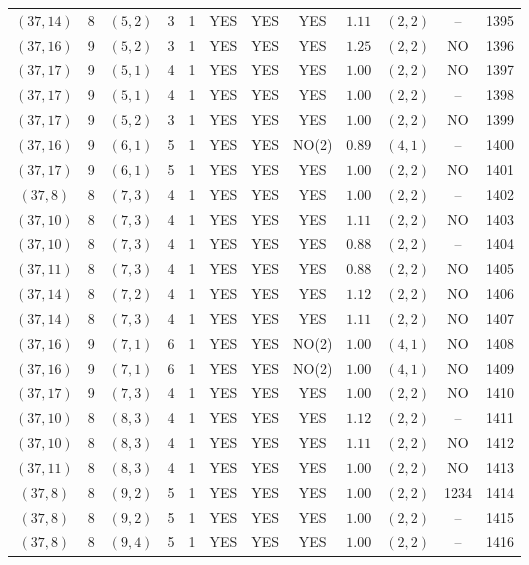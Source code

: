 \begin{longtable}{|c|c|c|c|c|c|c|c|c|c|c|c|}
$(37,14)$ & 8 & $(5,2)$ & 3 & 1 & YES & YES & YES & $1.11$ & $(2,2)$ & -- & 1395\\
$(37,16)$ & 9 & $(5,2)$ & 3 & 1 & YES & YES & YES & $1.25$ & $(2,2)$ & NO & 1396\\
$(37,17)$ & 9 & $(5,1)$ & 4 & 1 & YES & YES & YES & $1.00$ & $(2,2)$ & NO & 1397\\
$(37,17)$ & 9 & $(5,1)$ & 4 & 1 & YES & YES & YES & $1.00$ & $(2,2)$ & -- & 1398\\
$(37,17)$ & 9 & $(5,2)$ & 3 & 1 & YES & YES & YES & $1.00$ & $(2,2)$ & NO & 1399\\
$(37,16)$ & 9 & $(6,1)$ & 5 & 1 & YES & YES & NO(2) & $0.89$ & $(4,1)$ & -- & 1400\\
$(37,17)$ & 9 & $(6,1)$ & 5 & 1 & YES & YES & YES & $1.00$ & $(2,2)$ & NO & 1401\\
$(37,8)$ & 8 & $(7,3)$ & 4 & 1 & YES & YES & YES & $1.00$ & $(2,2)$ & -- & 1402\\
$(37,10)$ & 8 & $(7,3)$ & 4 & 1 & YES & YES & YES & $1.11$ & $(2,2)$ & NO & 1403\\
$(37,10)$ & 8 & $(7,3)$ & 4 & 1 & YES & YES & YES & $0.88$ & $(2,2)$ & -- & 1404\\
$(37,11)$ & 8 & $(7,3)$ & 4 & 1 & YES & YES & YES & $0.88$ & $(2,2)$ & NO & 1405\\
$(37,14)$ & 8 & $(7,2)$ & 4 & 1 & YES & YES & YES & $1.12$ & $(2,2)$ & NO & 1406\\
$(37,14)$ & 8 & $(7,3)$ & 4 & 1 & YES & YES & YES & $1.11$ & $(2,2)$ & NO & 1407\\
$(37,16)$ & 9 & $(7,1)$ & 6 & 1 & YES & YES & NO(2) & $1.00$ & $(4,1)$ & NO & 1408\\
$(37,16)$ & 9 & $(7,1)$ & 6 & 1 & YES & YES & NO(2) & $1.00$ & $(4,1)$ & NO & 1409\\
$(37,17)$ & 9 & $(7,3)$ & 4 & 1 & YES & YES & YES & $1.00$ & $(2,2)$ & NO & 1410\\
$(37,10)$ & 8 & $(8,3)$ & 4 & 1 & YES & YES & YES & $1.12$ & $(2,2)$ & -- & 1411\\
$(37,10)$ & 8 & $(8,3)$ & 4 & 1 & YES & YES & YES & $1.11$ & $(2,2)$ & NO & 1412\\
$(37,11)$ & 8 & $(8,3)$ & 4 & 1 & YES & YES & YES & $1.00$ & $(2,2)$ & NO & 1413\\
$(37,8)$ & 8 & $(9,2)$ & 5 & 1 & YES & YES & YES & $1.00$ & $(2,2)$ & 1234 & 1414\\
$(37,8)$ & 8 & $(9,2)$ & 5 & 1 & YES & YES & YES & $1.00$ & $(2,2)$ & -- & 1415\\
$(37,8)$ & 8 & $(9,4)$ & 5 & 1 & YES & YES & YES & $1.00$ & $(2,2)$ & -- & 1416\\

\end{longtable}
